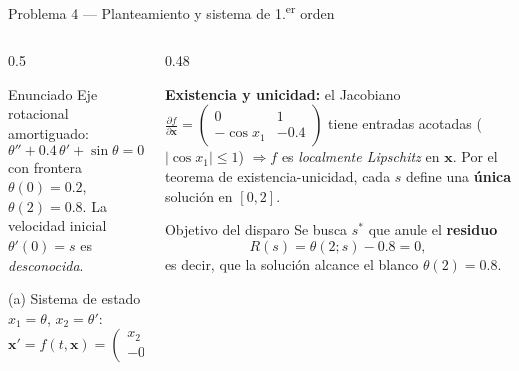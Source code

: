 \documentclass[aspectratio=169,10pt]{beamer}
\begin{document}
\begin{frame}{Problema 4 — Planteamiento y sistema de 1.\textsuperscript{er} orden}
\begin{columns}[T]
\begin{column}{0.5\textwidth}
\begin{cardidea}{Enunciado}{\faQuestionCircle}
{\footnotesize Eje rotacional amortiguado:
\[
\theta''+0.4\,\theta'+\sin\theta=0,\quad 0\le t\le2,
\]
con frontera $\theta(0)=0.2$, $\theta(2)=0.8$. La velocidad inicial $\theta'(0)=s$ es \emph{desconocida}.}
\end{cardidea}
\vspace{1mm}
\begin{cardgear}{(a) Sistema de estado}{\faSuperscript}
{\footnotesize $x_1=\theta$, $x_2=\theta'$:
\[
\mathbf x'=f(t,\mathbf x)=\begin{pmatrix}x_2\\ -0.4x_2-\sin x_1\end{pmatrix},\ \ \mathbf x(0)=\begin{pmatrix}0.2\\ s\end{pmatrix}.
\]}
\end{cardgear}
\end{column}
\begin{column}{0.48\textwidth}
\begin{cardnota}[\faCheckCircle]
{\footnotesize \textbf{Existencia y unicidad:} el Jacobiano
$\frac{\partial f}{\partial\mathbf x}=\left(\begin{smallmatrix}0 & 1\\ -\cos x_1 & -0.4\end{smallmatrix}\right)$
tiene entradas acotadas ($|\cos x_1|\le1$) $\Rightarrow f$ es \emph{localmente Lipschitz} en $\mathbf x$. Por el teorema de existencia-unicidad, cada $s$ define una \textbf{única} solución en $[0,2]$.}
\end{cardnota}
\vspace{1mm}
\begin{cardidea}{Objetivo del disparo}{\faCrosshairs}
{\footnotesize Se busca $s^*$ que anule el \textbf{residuo}
\[
R(s)=\theta(2;s)-0.8=0,
\]
es decir, que la solución alcance el blanco $\theta(2)=0.8$.}
\end{cardidea}
\end{column}
\end{columns}
\end{frame}
\end{document}
